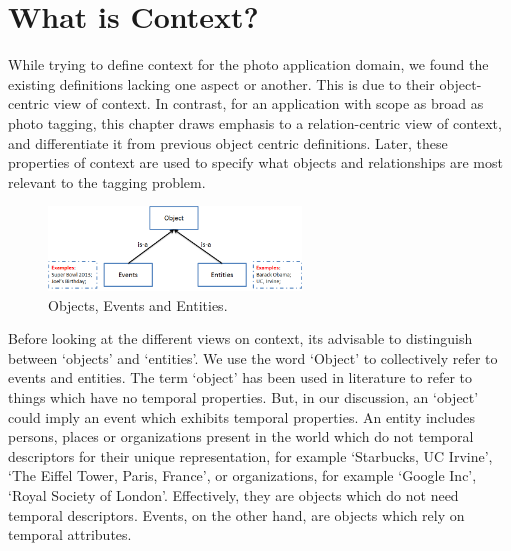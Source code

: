 \chapter{What is Context?}

While trying to define context for the photo application domain, we found the existing definitions lacking one aspect or another. This is due to their object-centric view of context. In contrast, for an application with scope as broad as photo tagging, this chapter draws emphasis to a relation-centric view of context, and differentiate it from previous object centric definitions. Later, these properties of context are used to specify what objects and relationships are most relevant to the tagging problem.
	
\begin{figure}[h]
\centering
\includegraphics[width=0.6\textwidth]{media/chapter1/terminology.png}
\caption{Objects, Events and Entities.}
\label{fig:terminology}
\end{figure}

Before looking at the different views on context, its advisable to distinguish between `objects' and `entities'. We use the word `Object' to collectively refer to events and entities. The term `object' has been used in literature to refer to things which have no temporal properties. But, in our discussion, an `object' could imply an event which exhibits temporal properties. An entity includes persons, places or organizations present in the world which do not temporal descriptors for their unique representation, for example `Starbucks, UC Irvine', `The Eiffel Tower, Paris, France', or organizations, for example `Google Inc', `Royal Society of London'. Effectively, they are objects which do not need temporal descriptors. Events, on the other hand, are objects which rely on temporal attributes.

